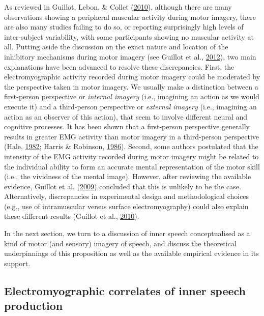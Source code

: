 \documentclass[a4paper,12pt,twoside,openright,oldfontcommands]{memoir}
\begin{document}
As reviewed in Guillot, Lebon, \& Collet (\protect\hyperlink{ref-guillot_electromyographic_2010}{2010}), although there are many observations showing a peripheral muscular activity during motor imagery, there are also many studies failing to do so, or reporting surprisingly high levels of inter-subject variability, with some participants showing no muscular activity at all. Putting aside the discussion on the exact nature and location of the inhibitory mechanisms during motor imagery (see Guillot et al., \protect\hyperlink{ref-guillot_imagining_2012}{2012}), two main explanations have been advanced to resolve these discrepancies. First, the electromyographic activity recorded during motor imagery could be moderated by the perspective taken in motor imagery. We usually make a distinction between a first-person perspective or \emph{internal imagery} (i.e., imagining an action as we would execute it) and a third-person perspective or \emph{external imagery} (i.e., imagining an action as an observer of this action), that seem to involve different neural and cognitive processes. It has been shown that a first-person perspective generally results in greater EMG activity than motor imagery in a third-person perspective (Hale, \protect\hyperlink{ref-hale_effects_1982}{1982}; Harris \& Robinson, \protect\hyperlink{ref-harris_effects_1986}{1986}). Second, some authors postulated that the intensity of the EMG activity recorded during motor imagery might be related to the individual ability to form an accurate mental representation of the motor skill (i.e., the vividness of the mental image). However, after reviewing the available evidence, Guillot et al. (\protect\hyperlink{ref-guillot_brain_2009}{2009}) concluded that this is unlikely to be the case. Alternatively, discrepancies in experimental design and methodological choices (e.g., use of intramuscular versus surface electromyography) could also explain these different results (Guillot et al., \protect\hyperlink{ref-guillot_electromyographic_2010}{2010}).

In the next section, we turn to a discussion of inner speech conceptualised as a kind of motor (and sensory) imagery of speech, and discuss the theoretical underpinnings of this proposition as well as the available empirical evidence in its support.

\hypertarget{electromyographic-correlates-of-inner-speech-production}{%
\subsection{Electromyographic correlates of inner speech production}\label{electromyographic-correlates-of-inner-speech-production}}
\end{document}
